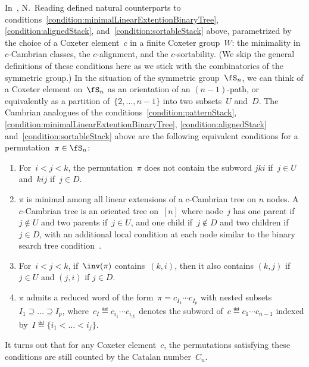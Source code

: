 In~\cite{Reading-latticeCongruences, Reading-cambrianLattices, Reading-coxeterSortable}, N.~Reading defined natural counterparts to conditions~\ref{condition:minimalLinearExtentionBinaryTree}, \ref{condition:alignedStack}, and~\ref{condition:sortableStack} above, parametrized by the choice of a Coxeter element~$c$ in a finite Coxeter group~$W$: the minimality in $c$-Cambrian classes, the $c$-alignment, and the $c$-sortability.
(We skip the general definitions of these conditions here as we stick with the combinatorics of the symmetric group.)
In the situation of the symmetric group~$\fS_n$, we can think of a Coxeter element on~$\fS_n$ as an orientation of an $(n-1)$-path, or equivalently as a partition of~$\{2, \dots, n-1\}$ into two subsets~$U$ and~$D$.
The Cambrian analogues of the conditions~\ref{condition:patternStack}, \ref{condition:minimalLinearExtentionBinaryTree}, \ref{condition:alignedStack} and~\ref{condition:sortableStack} above are the following equivalent conditions for a permutation~$\pi \in \fS_n$:
\begin{enumerate}[(i')]
\addtocounter{enumi}{1}
\item \label{condition:patternCambrian}
For~$i < j < k$, the permutation~$\pi$ does not contain the subword $jki$ if~$j \in U$ and~$kij$ if~$j \in D$.
\item \label{condition:minimalLinearExtentionCambrian}
$\pi$ is minimal among all linear extensions of a $c$-Cambrian tree on $n$ nodes. A $c$-Cambrian tree is an oriented tree on~$[n]$ where node~$j$ has one parent if~$j \notin U$ and two parents if~$j \in U$, and one child if~$j \notin D$ and two children if~$j \in D$, with an additional local condition at each node similar to the binary search tree condition~\cite{ChatelPilaud}.
\item \label{condition:alignedCambrian}
For~$i < j < k$, if~$\inv(\pi)$ contains~$(k,i)$, then it also contains $(k,j)$ if~$j \in U$ and $(j,i)$ if $j \in D$.
\item \label{condition:sortableCambrian}
$\pi$ admits a reduced word of the form~$\pi = c_{I_1} \cdots c_{I_p}$ with nested subsets ${I_1 \supseteq \dots \supseteq I_p}$, where~$c_I \eqdef c_{i_1} \cdots c_{i_{|I|}}$ denotes the subword of~$c \eqdef c_1 \cdots c_{n-1}$ indexed by~$I \eqdef \{i_1 < \dots < i_j\}$.
\end{enumerate}
It turns out that for any Coxeter element~$c$, the permutations satisfying these conditions are still counted by the Catalan number~$C_n$.

